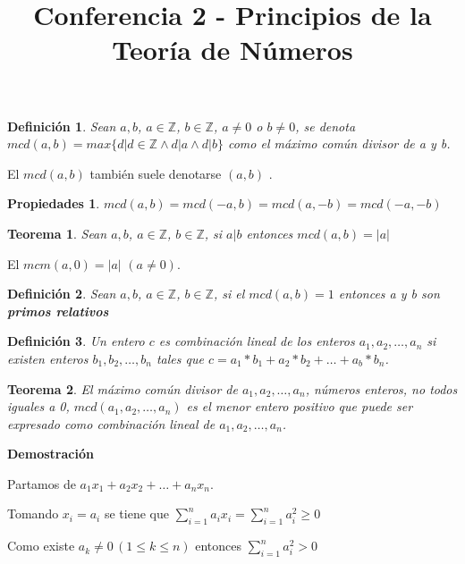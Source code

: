 \documentclass[a4paper,1pt]{report}
\title{Conferencia 2 - Principios de la Teoría de Números}
\author{}
\newtheorem*{teo}{Teorema}
\newtheorem*{dfn}{Definición}
\newtheorem*{prp}{Propiedades}
\begin{document}
\maketitle





\begin{dfn}
 Sean $a,b$, $a\in\mathbb{Z}$, $b\in\mathbb{Z}$, $a\neq 0$ o $b\neq 0$, se denota\\ $mcd(a,b)=max\{d|   d\in\mathbb{Z}\wedge d|a\wedge d|b\}$ como el máximo común divisor de a y b.
\end{dfn}

El $mcd(a,b)$ también suele denotarse $(a,b)$ .



\begin{prp}
 $mcd(a,b)=mcd(-a,b)=mcd(a,-b)=mcd(-a,-b)$
\end{prp}

\begin{teo}
 Sean $a,b$, $a\in\mathbb{Z}$, $b\in\mathbb{Z}$, si $a|b$ entonces $mcd(a,b)=|a|$
\end{teo}

El $mcm(a,0)=|a|$ $(a\neq0)$.


\begin{dfn}
 Sean $a,b$, $a\in\mathbb{Z}$, $b\in\mathbb{Z}$, si el $mcd(a,b)=1$ entonces a y b son \textbf{primos relativos}
\end{dfn}

\begin{dfn}
 Un entero $c$ es combinación lineal de los enteros $a_1,a_2,\dots,a_n$ si existen enteros $b_1,b_2,\dots,b_n$ tales que $c=a_1*b_1+a_2*b_2+\dots+a_b*b_n$.
\end{dfn}

\begin{teo}
 El máximo común divisor de  $a_1,a_2,\dots,a_n$, números enteros, no todos iguales a 0, $mcd(a_1,a_2,\dots,a_n)$ es el menor entero positivo que puede ser expresado como combinación lineal de $a_1,a_2,\dots,a_n$.
\end{teo}

\textbf{Demostración}

Partamos de $a_1x_1+a_2x_2+\dots+a_nx_n$.

Tomando $x_i=a_i$ se tiene que $\sum^n_{i=1}a_ix_i=\sum^n_{i=1}a_i^2\geq0$

Como existe $a_k\neq 0 \, (1\leq k \leq n)$ entonces $\sum^n_{i=1}a_i^2>0$
\end{document}
